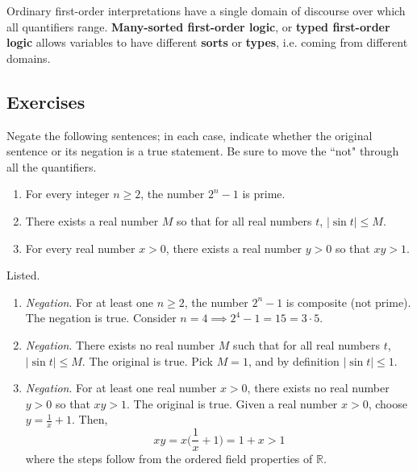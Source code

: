\documentclass{article}
\begin{document}
  Ordinary first-order interpretations have a single domain of discourse over which all quantifiers range. \textbf{Many-sorted first-order logic}, or \textbf{typed first-order logic} allows variables to have different \textbf{sorts} or \textbf{types}, i.e. coming from different domains.  

  \subsection{Exercises}

    \begin{exercise} 
      Negate the following sentences; in each case, indicate whether the original sentence or its negation is a true statement. Be sure to move the ``not" through all the quantifiers.
      \begin{enumerate}
        \item For every integer $n \geq 2$, the number $2^n - 1$ is prime.
        \item There exists a real number $M$ so that for all real numbers $t$, $|\sin t| \leq M$.
        \item For every real number $x > 0$, there exists a real number $y > 0$ so that $xy > 1$.
      \end{enumerate}
    \end{exercise}
    \begin{solution}
      Listed. 
      \begin{enumerate}
        \item \textit{Negation}. For at least one $n \geq 2$, the number $2^n - 1$ is composite (not prime). The negation is true. Consider $n = 4 \implies 2^4 - 1 = 15 = 3 \cdot 5$. 

        \item \textit{Negation}. There exists no real number $M$ such that for all real numbers $t$, $|\sin{t}| \leq M$. The original is true. Pick $M=1$, and by definition $|\sin{t}| \leq 1$. 

        \item \textit{Negation}. For at least one real number $x > 0$, there exists no real number $y > 0$ so that $xy > 1$. The original is true. Given a real number $x > 0$, choose $y = \frac{1}{x} + 1$. Then, 
        \begin{equation}
          xy = x \bigg( \frac{1}{x} + 1 \bigg) = 1 + x > 1
        \end{equation} 
        where the steps follow from the ordered field properties of $\mathbb{R}$. 
      \end{enumerate}
    \end{solution} 
\end{document}
